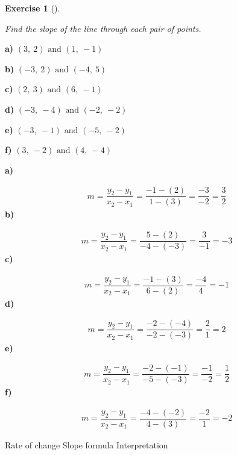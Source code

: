 \documentclass[
  letterpaper,
  DIV=11,
  numbers=noendperiod]{scrreprt}
\theoremstyle{definition}
\newtheorem{exercise}{Exercise}[chapter]
\theoremstyle{remark}
\begin{document}
\begin{exercise}[]\protect\hypertarget{exr-u7-10}{}\label{exr-u7-10}

\emph{Find the slope of the line through each pair of points.}

\textbf{a)} \(\displaystyle (3,\ 2) \text{ and } (1,\ -1)\)

\textbf{b)} \(\displaystyle (-3,\ 2) \text{ and } (-4,\ 5)\)

\textbf{c)} \(\displaystyle (2,\ 3) \text{ and } (6,\ -1)\)

\textbf{d)} \(\displaystyle (-3,\ -4) \text{ and } (-2,\ -2)\)

\textbf{e)} \(\displaystyle (-3,\ -1) \text{ and } (-5,\ -2)\)

\textbf{f)} \(\displaystyle (3,\ -2) \text{ and } (4,\ -4)\)

\begin{tcolorbox}[enhanced jigsaw, opacitybacktitle=0.6, coltitle=black, arc=.35mm, colframe=quarto-callout-tip-color-frame, colback=white, bottomrule=.15mm, left=2mm, colbacktitle=quarto-callout-tip-color!10!white, titlerule=0mm, opacityback=0, title=\textcolor{quarto-callout-tip-color}{\faLightbulb}\hspace{0.5em}{🔍 View Solutions}, leftrule=.75mm, breakable, rightrule=.15mm, bottomtitle=1mm, toptitle=1mm, toprule=.15mm]

\textbf{a)}

\[
\begin{aligned}
m = \dfrac{y_2 - y_1}{x_2 - x_1} = \dfrac{-1 - (2)}{1 - (3)} = \dfrac{-3}{-2} = \dfrac{3}{2}
\end{aligned}
\] \textbf{b)}

\[
\begin{aligned}
m = \dfrac{y_2 - y_1}{x_2 - x_1} = \dfrac{5 - (2)}{-4 - (-3)} = \dfrac{3}{-1} = -3
\end{aligned}
\] \textbf{c)}

\[
\begin{aligned}
m = \dfrac{y_2 - y_1}{x_2 - x_1} = \dfrac{-1 - (3)}{6 - (2)} = \dfrac{-4}{4} = -1
\end{aligned}
\] \textbf{d)}

\[
\begin{aligned}
m = \dfrac{y_2 - y_1}{x_2 - x_1} = \dfrac{-2 - (-4)}{-2 - (-3)} = \dfrac{2}{1} = 2
\end{aligned}
\] \textbf{e)}

\[
\begin{aligned}
m = \dfrac{y_2 - y_1}{x_2 - x_1} = \dfrac{-2 - (-1)}{-5 - (-3)} = \dfrac{-1}{-2} = \dfrac{1}{2}
\end{aligned}
\] \textbf{f)}

\[
\begin{aligned}
m = \dfrac{y_2 - y_1}{x_2 - x_1} = \dfrac{-4 - (-2)}{4 - (3)} = \dfrac{-2}{1} = -2
\end{aligned}
\]

\end{tcolorbox}

{Rate of change} {Slope formula} {Interpretation}

\end{exercise}
\end{document}
